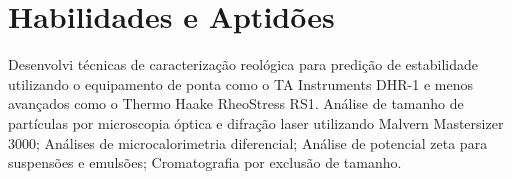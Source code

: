 \section{Habilidades e Aptidões}

{Desenvolvi técnicas de caracterização reológica para 
predição de estabilidade utilizando o 
equipamento de ponta como o TA Instruments DHR-1 e 
menos avançados como o Thermo Haake RheoStress RS1.}\hfill
{}
{Análise de tamanho de partículas por microscopia óptica e difração laser utilizando Malvern Mastersizer 3000;
Análises de microcalorimetria diferencial;
Análise de potencial zeta para suspensões e emulsões;
Cromatografia por exclusão de tamanho.}

\hfill
{}\hfill

\hfill
{}


